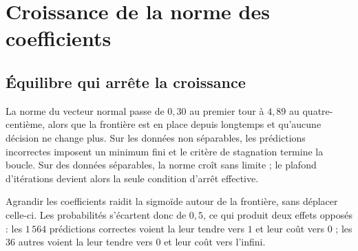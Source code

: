 \chapter{Croissance de la norme des coefficients}
\label{ann:norme}


\section{Équilibre qui arrête la croissance}

La norme du vecteur normal passe de $0{,}30$ au premier tour à $4{,}89$ au
quatre-centième, alors que la frontière est en place depuis longtemps et
qu'aucune décision ne change plus. Sur les données non séparables, les
prédictions incorrectes imposent un minimum fini et le critère de stagnation
termine la boucle. Sur des données séparables, la norme croît sans limite ; le
plafond d'itérations devient alors la seule condition d'arrêt effective.

Agrandir les coefficients raidit la sigmoïde autour de la frontière, sans
déplacer celle-ci. Les probabilités s'écartent donc de $0{,}5$, ce qui produit
deux effets opposés : les $1\,564$ prédictions correctes voient la leur tendre vers
$1$ et leur coût vers $0$ ; les $36$ autres voient la leur tendre vers $0$ et leur
coût vers l'infini.


